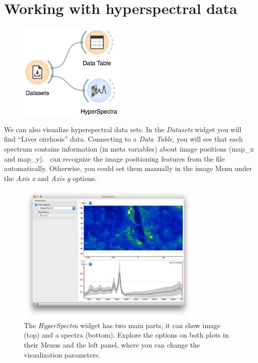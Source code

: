 \chapter{Working with hyperspectral data}
\label{ch:hyper_basic}


\begin{figure}
    \centering
    \vspace{-3cm}
    \includegraphics[width=0.45\textwidth]{graphics/ch-hyper_basic/hyperspectral-fig1.png}
    \label{fig:hyper_basic-fig1}
\end{figure}

We can also visualize hyperspectral data sets. In the \textit{Datasets} widget you will find “Liver cirrhosis” data. Connecting to a \textit{Data Table}, you will see that each spectrum contains information (in meta variables) about image positions (map\_x and map\_y). \mutation\ can recognize the image positioning features from the file automatically. Otherwise, you could set them manually in the image Menu under the \textit{Axis x} and \textit{Axis y} options. 

\begin{figure}[h]
    \centering
    \includegraphics[width=0.8\textwidth]{graphics/ch-hyper_basic/hyperspectral-fig2.png}
    \caption{The \textit{HyperSpectra} widget has two main parts, it can show image (top) and a spectra (bottom). Explore the options on both plots in their Menus and the left panel, where you can change the visualization parameters.}
    \label{fig:hyper_basic-fig2}
\end{figure}

